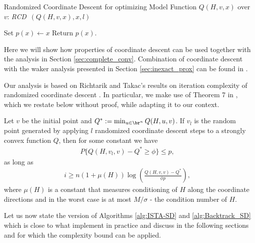 \documentclass[11pt]{article}
\numberwithin{equation}{section}
\begin{document}
\begin{algorithm2e}\caption{Randomized Coordinate Descent for optimizing Model Function $Q(H, v, x)$ over $v$: {\em RCD\ }$(Q(H, v, x), x, l)$ }
    \label{alg:randomized_cd}%
Set $p(x) \gets x $\; 
Return $p(x)$.
\end{algorithm2e}







Here we will show how properties of coordinate descent can be used together with the analysis in Section \ref{sec:complete_conv}. Combination of
coordinate descent with the waker analysis presented in Section \ref{sec:inexact_prox} can be found in \cite{OML}. 

Our analysis is based on Richtarik and Takac's results on iteration complexity of randomized coordinate descent  \cite{Richtarik2012}. In particular, we make use of Theorem 7 in \cite{Richtarik2012}, which we restate below without proof, while adapting it to our context.

\begin{lemma}\label{lem:randomized_CD}

Let $v$ be the initial point and $Q^* := \min_{u\in\br^n} Q(H, u,v)$. If $v_l$ is the random point generated by applying $l$ randomized coordinate descent steps to a strongly convex function $Q$, then for some constant 
we have
\begin{align*}
    P\{Q(H,v_l,v) - Q^*\geq \phi\} \leq p, 
\end{align*}
as long as 
\begin{align*}
i\geq n(1+\mu(H)) \log(\frac{Q(H,v,v) - Q^*}{\phi p}),
\end{align*}
where $\mu(H)$ is a constant that measures conditioning of $H$ along the coordinate directions and in the worst case is at most $M/\sigma$ - the condition 
number of $H$.
\end{lemma}

Let us now state the version of  Algorithms \ref{alg:ISTA-SD} and \ref{alg:Backtrack_SD} which is close to what implement in practice and 
discuss in the following sections  and for which the complexity  bound can be applied.
\end{document}
